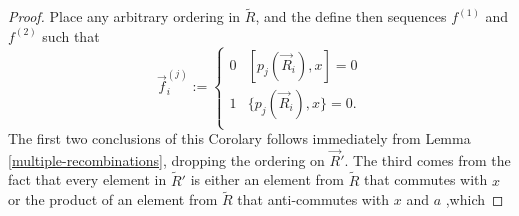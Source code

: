 \documentclass[twocolumn,showpacs,preprintnumbers,amsmath,amssymb,nofootinbib,pra,floatfix]{revtex4-1}
\newcommand{\lst}{\vec}
\newcommand{\set}{\tilde}
\begin{document}
\begin{proof}
Place any arbitrary ordering in $\set R$, and the define then sequences $f^{(1)}$ and $f^{(2)}$ such that
$$\lst f^{(j)}_i :=
\begin{cases}
0 & [p_j(\lst R_i),x] = 0 \\
1 & \{p_j(\lst R_i),x\} = 0. \\
\end{cases}
$$
The first two conclusions of this Corolary follows immediately from Lemma \ref{multiple-recombinations}, dropping the ordering on $\lst R'$.  The third comes from the fact that every element in $\set R'$ is either an element from $\set R$ that commutes with $x$ or the product of an element from $\set R$ that anti-commutes with $x$ and $a$ ,which 
\end{proof}
\end{document}
